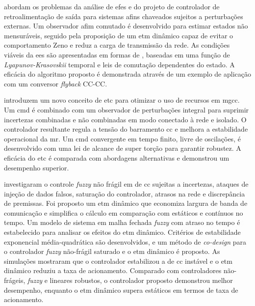 \cite{Xie2023} abordam os problemas da análise de \acrshort{efes} e do projeto de controlador de retroalimentação de saída para sistemas afins chaveados sujeitos a perturbações externas. Um observador afim comutado é desenvolvido para estimar estados não mensuráveis, seguido pela proposição de um \acrshort{etm} dinâmico capaz de evitar o comportamento Zeno e reduz a carga de transmissão da rede. As condições viáveis da \acrshort{ees} são apresentadas em formas de , baseadas em uma função de \textit{\textit{Lyapunov}-Krasovskii} temporal e leis de comutação dependentes do estado. A eficácia do algoritmo proposto é demonstrada através de um exemplo de aplicação com um conversor \textit{flyback} CC-CC.

\cite{Kumar2020} introduzem um novo conceito de \acrshort{etc} para otimizar o uso de recursos em \acrshort{mgcc}. Um \acrfull{cmd} é combinado com um observador de perturbações integral para suprimir incertezas combinadas e não combinadas em modo conectado à rede e isolado. O controlador resultante regula a tensão do barramento \acrshort{cc} e melhora a estabilidade operacional da \acrshort{mr}. Um \acrshort{cmd} convergente em tempo finito, livre de oscilações, é desenvolvido com uma lei de alcance de super torção para garantir robustez. A eficácia do \acrshort{etc} é comparada com abordagens alternativas e demonstrou um desempenho superior.

\cite{Li2023} investigaram o controle \textit{fuzzy} não frágil em  de \acrshort{cc} sujeitas a incertezas, ataques de injeção de dados falsos, saturação do controlador, atrasos na rede e discrepância de premissas. Foi proposto um \acrshort{etm} dinâmico que economiza largura de banda de comunicação e simplifica o cálculo em comparação com  estáticos e contínuos no tempo. Um modelo de sistema em malha fechada \textit{fuzzy} com atraso no tempo é estabelecido para analisar os efeitos do \acrshort{etm} dinâmico. Critérios de estabilidade exponencial média-quadrática são desenvolvidos, e um método de \textit{co-design} para o controlador \textit{fuzzy} não-frágil saturado e o \acrshort{etm} dinâmico é proposto. As simulações mostraram que o controlador estabilizou a  de \acrshort{cc} instável e o \acrshort{etm} dinâmico reduziu a taxa de acionamento. Comparado com controladores não-frágeis, \textit{fuzzy} e lineares robustos, o controlador proposto demonstrou melhor desempenho, enquanto o \acrshort{etm} dinâmico supera  estáticos em termos de taxa de acionamento.

